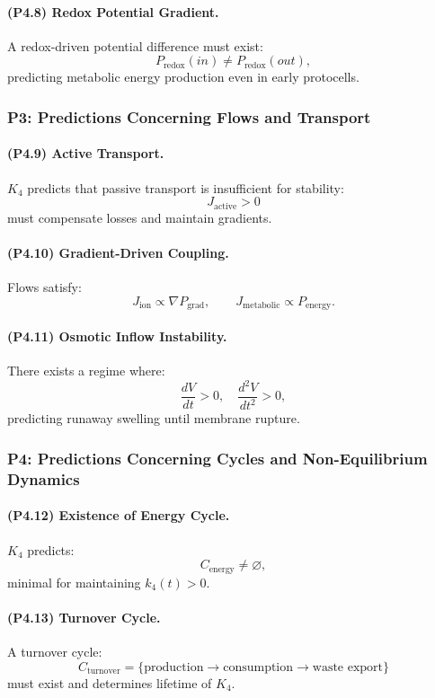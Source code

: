 \paragraph{(P4.8) Redox Potential Gradient.}
A redox-driven potential difference must exist:
\[
P_{\mathrm{redox}}(in) \neq P_{\mathrm{redox}}(out),
\]
predicting metabolic energy production even in early protocells.

\subsubsection{P3: Predictions Concerning Flows and Transport}

\paragraph{(P4.9) Active Transport.}
$K_4$ predicts that passive transport is insufficient for stability:
\[
J_{\mathrm{active}} > 0
\]
must compensate losses and maintain gradients.

\paragraph{(P4.10) Gradient-Driven Coupling.}
Flows satisfy:
\[
J_{\mathrm{ion}} \propto \nabla P_{\mathrm{grad}},
\qquad
J_{\mathrm{metabolic}} \propto P_{\mathrm{energy}}.
\]

\paragraph{(P4.11) Osmotic Inflow Instability.}
There exists a regime where:
\[
\frac{dV}{dt} > 0, \quad \frac{d^2V}{dt^2} > 0,
\]
predicting runaway swelling until membrane rupture.

\subsubsection{P4: Predictions Concerning Cycles and Non-Equilibrium Dynamics}

\paragraph{(P4.12) Existence of Energy Cycle.}
$K_4$ predicts:
\[
C_{\mathrm{energy}} \neq \varnothing,
\]
minimal for maintaining $k_4(t)>0$.

\paragraph{(P4.13) Turnover Cycle.}
A turnover cycle:
\[
C_{\mathrm{turnover}} =
\{\text{production} \to \text{consumption} \to \text{waste export}\}
\]
must exist and determines lifetime of $K_4$.

